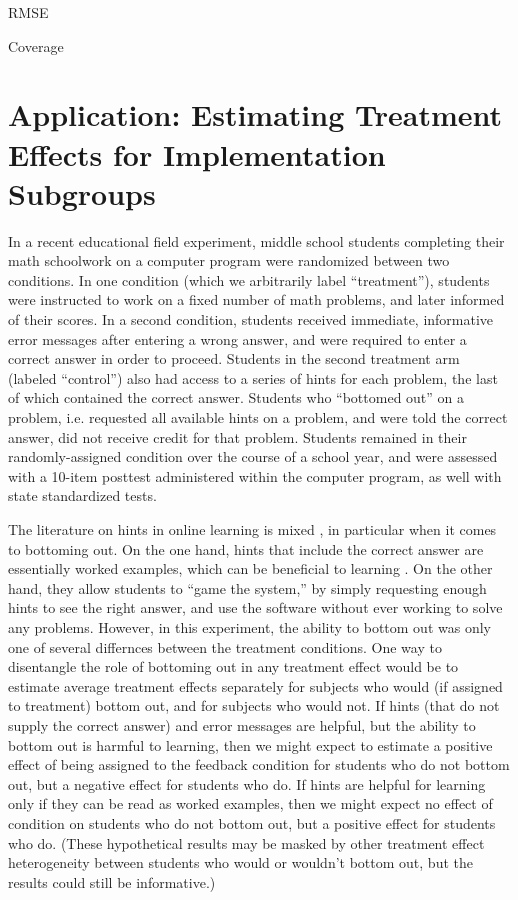 \documentclass[11pt]{article} %
\begin{document}
  \begin{table}
    \centering
  
  \caption{RMSE }
\end{table}

\begin{table}
  
  \caption{Coverage}
  \label{tab:coverage}
\end{table}


\section{Application: Estimating Treatment Effects for Implementation Subgroups}

In a recent educational field experiment, middle school students completing their math schoolwork on a computer program were randomized between two conditions. In one condition (which we arbitrarily label ``treatment''), students were instructed to work on a fixed number of math problems, and later informed of their scores. In a second condition, students received immediate, informative error messages after entering a wrong answer, and were required to enter a correct answer in order to proceed. Students in the second treatment arm (labeled ``control'') also had access to a series of hints for each problem, the last of which contained the correct answer. Students who ``bottomed out'' on a problem, i.e. requested all available hints on a problem, and were told the correct answer, did not receive credit for that problem. Students remained in their randomly-assigned condition over the course of a school year, and were assessed with a 10-item posttest administered within the computer program, as well with state standardized tests.

The literature on hints in online learning is mixed \citep{stuff}, in particular when it comes to bottoming out. On the one hand, hints that include the correct answer are essentially worked examples, which can be beneficial to learning \citep{worked example stuff}. On the other hand, they allow students to ``game the system,'' by simply requesting enough hints to see the right answer, and use the software without ever working to solve any problems. However, in this experiment, the ability to bottom out was only one of several differnces between the treatment conditions. One way to disentangle the role of bottoming out in any treatment effect would be to estimate average treatment effects separately for subjects who would (if assigned to treatment) bottom out, and for subjects who would not. If hints (that do not supply the correct answer) and error messages are helpful, but the ability to bottom out is harmful to learning, then we might expect to estimate a positive effect of being assigned to the feedback condition for students who do not bottom out, but a negative effect for students who do. If hints are helpful for learning only if they can be read as worked examples, then we might expect no effect of condition on students who do not bottom out, but a positive effect for students who do. (These hypothetical results may be masked by other treatment effect heterogeneity between students who would or wouldn't bottom out, but the results could still be informative.)
\end{document}
